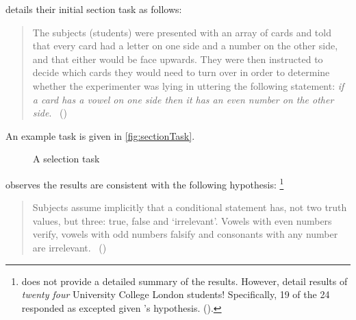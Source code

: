 \begin{note}
  \citeauthor{Wason:1966aa} details their initial section task as follows:

  \begin{quote}
    The subjects (students) were presented with an array of cards and told that every card had a letter on one side and a number on the other side, and that either would be face upwards.
    They were then instructed to decide which cards they would need to turn over in order to determine whether the experimenter was lying in uttering the following statement:
    \emph{if a card has a vowel on one side then it has an even number on the other side}.%
    \mbox{ }\hfill\mbox{(\citeyear[145--146]{Wason:1966aa})}
  \end{quote}

  An example task is given in \autoref{fig:sectionTask}.

  \begin{figure}[H]
    \centering
    \caption{A selection task}
    \label{fig:sectionTask}
  \end{figure}

  \citeauthor{Wason:1966aa} observes the results are consistent with the following hypothesis:%
  \footnote{
    \citeauthor{Wason:1966aa} does not provide a detailed summary of the results.
    However, \citeauthor{Johnson-Laird:1969aa} detail results of \emph{twenty four} University College London students!
    Specifically, 19 of the 24 responded as excepted given \citeauthor{Wason:1966aa}'s hypothesis.
    (\citeyear[369--370]{Johnson-Laird:1969aa}).
  }
  \begin{quote}
    Subjects assume implicitly that a conditional statement has, not two truth values, but three: true, false and `irrelevant'.
    Vowels with even numbers verify, vowels with odd numbers falsify and consonants with any number are irrelevant.%
    \mbox{ }\hfill\mbox{(\citeyear[146]{Wason:1966aa})}
  \end{quote}
\end{note}

